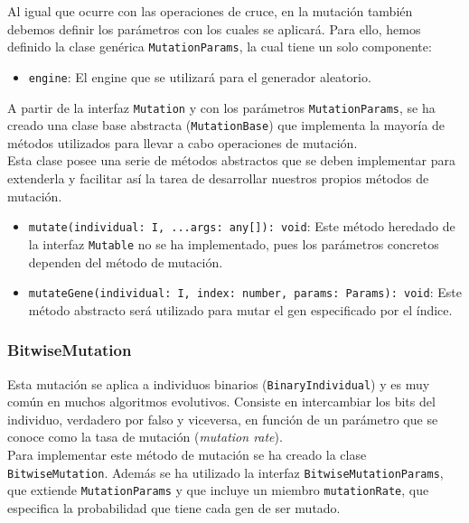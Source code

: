 Al igual que ocurre con las operaciones de cruce, en la mutación también debemos definir los parámetros con los cuales se aplicará. Para ello, hemos definido la clase genérica \texttt{MutationParams}, la cual tiene un solo componente:

\begin{itemize}
    \item \texttt{engine}: El engine que se utilizará para el generador aleatorio.
\end{itemize}

A partir de la interfaz \texttt{Mutation} y con los parámetros \texttt{MutationParams}, se ha creado una clase base abstracta (\texttt{MutationBase}) que implementa la mayoría de métodos utilizados para llevar a cabo operaciones de mutación.\\

Esta clase posee una serie de métodos abstractos que se deben implementar para extenderla y facilitar así la tarea de desarrollar nuestros propios métodos de mutación.

\begin{itemize}
    \item \texttt{mutate(individual: I, ...args: any[]): void}: Este método heredado de la interfaz \texttt{Mutable} no se ha implementado, pues los parámetros concretos dependen del método de mutación.
    \item \texttt{mutateGene(individual: I, index: number, params: Params): void}: Este método abstracto será utilizado para mutar el gen especificado por el índice.
\end{itemize}

\subsubsection{BitwiseMutation}

Esta mutación se aplica a individuos binarios (\texttt{BinaryIndividual}) y es muy común en muchos algoritmos evolutivos. Consiste en intercambiar los bits del individuo, verdadero por falso y viceversa, en función de un parámetro que se conoce como la tasa de mutación (\textit{mutation rate}). \\

Para implementar este método de mutación se ha creado la clase \texttt{BitwiseMutation}. Además se ha utilizado la interfaz \texttt{BitwiseMutationParams}, que extiende \texttt{MutationParams} y que incluye un miembro \texttt{mutationRate}, que especifica la probabilidad que tiene cada gen de ser mutado.

